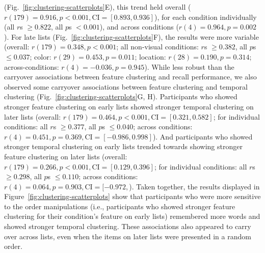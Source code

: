 \documentclass[11pt]{article}
\begin{document}
(Fig.~\ref{fig:clustering-scatterplots}E), this trend held overall ($r(179) =
0.916, p < 0.001, \mathrm{CI} = [0.893, 0.936]$), for each condition
individually (all $r$s $\geq 0.822$, all $p$s $< 0.001$), and across conditions
($r(4) = 0.964, p = 0.002$). For late lists
(Fig.~\ref{fig:clustering-scatterplots}F), the results were more variable
(overall: $r(179) = 0.348, p < 0.001$; all non-visual conditions: $r$s $\geq
0.382$, all $p$s $\leq 0.037$; color: $r(29) = 0.453, p = 0.011$; location: $
r(28) = 0.190, p = 0.314$; across-conditions: $r(4) = -0.036, p = 0.945$).
While less robust than the carryover associations between feature clustering
and recall performance, we also observed some carryover associations between
feature clustering and temporal clustering
(Fig.~\ref{fig:clustering-scatterplots}G, H). Participants who showed stronger
feature clustering on early lists showed stronger temporal
clustering on later lists (overall: $r(179) = 0.464, p < 0.001, \mathrm{CI} =
[0.321, 0.582]$; for individual conditions: all $r$s $\geq 0.377$, all $p$s
$\leq 0.040$; across conditions: $ r(4) = 0.451, p = 0.369, \mathrm{CI} =
[-0.986, 0.998]$). And participants who showed stronger temporal clustering on
early lists trended towards showing stronger feature clustering on later lists
(overall: $r(179) = 0.266, p < 0.001, \mathrm{CI} = [0.129, 0.396]$; for
individual conditions: all $r$s $\geq 0.298$, all $p$s $\leq 0.110$; across
conditions: $r(4) = 0.064, p = 0.903, \mathrm{CI} = [-0.972,$). Taken together,
the results displayed in Figure~\ref{fig:clustering-scatterplots} show that
participants who were more sensitive to the order manipulations (i.e.,
participants who showed stronger feature clustering for their condition's
feature on early lists) remembered more words and showed stronger temporal
clustering. These associations also appeared to carry over across lists, even
when the items on later lists were presented in a random order.
\end{document}
